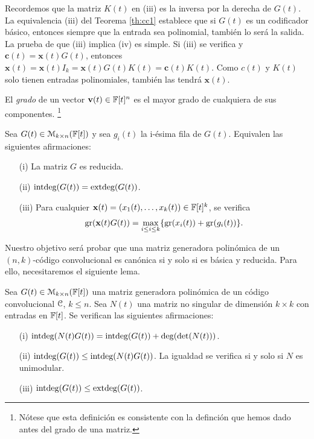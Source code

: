 Recordemos que la matriz $K(t)$ en (iii) es la inversa por la derecha de $G(t)$. La equivalencia (iii) del Teorema \ref{th:cc1} establece que si $G(t)$ es un codificador básico, entonces siempre que la entrada sea polinomial, también lo será la salida. La prueba de que (iii) implica (iv) es simple. Si (iii) se verifica y $\mathbf{c}(t) = \mathbf{x}(t)G(t)$, entonces $\mathbf{x}(t) = \mathbf{x}(t)I_k = \mathbf{x}(t)G(t)K(t) = \mathbf{c}(t)K(t)$. Como $c(t)$ y $K(t)$ solo tienen entradas polinomiales, también las tendrá $\mathbf{x}(t)$.

\begin{definicion}
El \emph{grado} de un vector $\mathbf{v}(t) \in \mathbb{F}[t]^n$ es el mayor grado de cualquiera de sus componentes. \footnote{Nótese que esta definición es consistente con la definción que hemos dado antes del grado de una matriz.}
\end{definicion}

\begin{teorema}
\label{th:aux}
Sea $G(t) \in \mathcal{M}_{k \times n}(\mathbb{F}[t])$ y sea $g_i(t)$ la i-ésima fila de $G(t)$. Equivalen las siguientes afirmaciones:
\begin{itemize}
    \item[(i)] La matriz $G$ es reducida.
    \item[(ii)] $\textnormal{intdeg}(G(t)) = \textnormal{extdeg}(G(t))$.
    \item[(iii)] Para cualquier $\mathbf{x}(t) = (x_1(t),\dots,x_k(t)) \in \mathbb{F}[t]^k$, se verifica 
    $$\operatorname{gr}(\mathbf{x}(t)G(t)) = \max_{i \leq i \leq k} \{\operatorname{gr}(x_i(t)) + \operatorname{gr}(g_i(t))\}.$$  
\end{itemize}
\end{teorema}

Nuestro objetivo será probar que una matriz generadora polinómica de un $(n,k)$-código convolucional es canónica si y solo si es básica y reducida. Para ello, necesitaremos el siguiente lema.

\begin{lema}
\label{lm:cc1}
Sea $G(t) \in \mathcal{M}_{k \times n}(\mathbb{F}[t])$ una matriz generadora polinómica de un código convolucional $\mathcal C$, $ k \leq n$. Sea $N(t)$ una matriz no singular de dimensión $k \times k$ con entradas en $\mathbb{F}[t]$. Se verifican las siguientes afirmaciones:
\begin{itemize}
    \item[(i)] $\textnormal{intdeg}(N(t)G(t)) = \textnormal{intdeg}(G(t)) + \deg(\det(N(t)))$.
    \item[(ii)] $\textnormal{intdeg}(G(t)) \leq \textnormal{intdeg}(N(t)G(t))$. La igualdad se verifica si y solo si $N$ es unimodular.
    \item[(iii)] $\textnormal{intdeg}(G(t)) \leq \textnormal{extdeg}(G(t))$.  
\end{itemize}
\end{lema}


